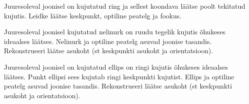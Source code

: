 \documentclass[a4paper,11pt,twocolumn]{article}
\begin{document}
\begin{question}[Lõppv 2015, G7][gop5][7cm]
  Juuresoleval joonisel on kujutatud ring ja sellest koondava läätse
  poolt tekitatud kujutis. Leidke läätse keskpunkt, optiline peatelg
  ja fookus.
\end{question}

\begin{question}[PhysCup 2012, P7]
  Juuresoleval joonisel kujutatud nelinurk on ruudu tegelik kujutis
  õhukeses ideaalses läätses. Nelinurk ja optiline peatelg asuvad
  joonise tasandis. Rekonstrueeri läätse asukoht (st keskpunkti
  asukoht ja orientatsioon).
\end{question}
\begin{figure}[h!]
    \centering
    \vspace{-1em}
\end{figure}


\begin{question}[PhysCup 2017, P4][gop7][8cm]
  Juuresoleval joonisel on kujutatud ellips on ringi kujutis õhukeses
  ideaalses läätses. Punkt ellipsi sees kujutab ringi keskpunkti
  kujutist. Ellips ja optiline peatelg asuvad joonise
  tasandis. Rekonstrueeri läätse asukoht (st keskpunkti asukoht ja
  orientatsioon).
\end{question}

%
%
%
\end{document}
